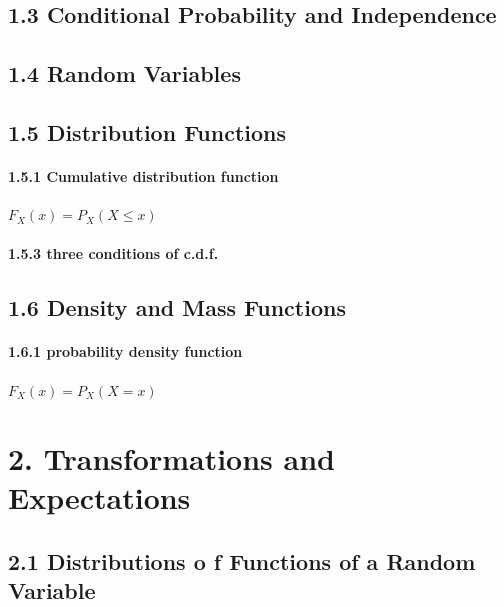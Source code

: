 \documentclass[6pt,Portrait]{article}
\let\oldparagraph\paragraph
\renewcommand{\paragraph}[1]{\oldparagraph{#1}\mbox{}}
\begin{document}
\hypertarget{conditional-probability-and-independence}{%
\subsection{1.3 Conditional Probability and
Independence}\label{conditional-probability-and-independence}}

\hypertarget{random-variables}{%
\subsection{1.4 Random Variables}\label{random-variables}}

\hypertarget{distribution-functions}{%
\subsection{1.5 Distribution Functions}\label{distribution-functions}}

\hypertarget{CDF}{%
\paragraph{1.5.1 Cumulative distribution function}\label{CDF}}

\(F_X(x)=P_X(X\le x)\)

\hypertarget{cdfP}{%
\paragraph{1.5.3 three conditions of c.d.f.}\label{cdfP}}

\hypertarget{density-and-mass-functions}{%
\subsection{1.6 Density and Mass
Functions}\label{density-and-mass-functions}}

\hypertarget{PDF}{%
\paragraph{1.6.1 probability density function}\label{PDF}}

\(F_X(x)=P_X(X= x)\)

\hypertarget{transformations-and-expectations}{%
\section{2. Transformations and
Expectations}\label{transformations-and-expectations}}

\hypertarget{distributions-o-f-functions-of-a-random-variable}{%
\subsection{2.1 Distributions o f Functions of a Random
Variable}\label{distributions-o-f-functions-of-a-random-variable}}
\end{document}
